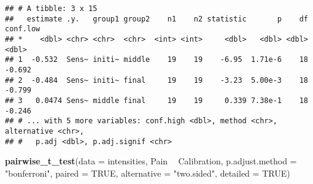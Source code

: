 \documentclass[
]{article}
\newenvironment{Shaded}{\begin{snugshade}}{\end{snugshade}}
\newcommand{\CommentTok}[1]{\textcolor[rgb]{0.56,0.35,0.01}{\textit{#1}}}
\newcommand{\DataTypeTok}[1]{\textcolor[rgb]{0.13,0.29,0.53}{#1}}
\newcommand{\DecValTok}[1]{\textcolor[rgb]{0.00,0.00,0.81}{#1}}
\newcommand{\KeywordTok}[1]{\textcolor[rgb]{0.13,0.29,0.53}{\textbf{#1}}}
\newcommand{\NormalTok}[1]{#1}
\newcommand{\OperatorTok}[1]{\textcolor[rgb]{0.81,0.36,0.00}{\textbf{#1}}}
\newcommand{\OtherTok}[1]{\textcolor[rgb]{0.56,0.35,0.01}{#1}}
\newcommand{\StringTok}[1]{\textcolor[rgb]{0.31,0.60,0.02}{#1}}
\begin{document}
\begin{Shaded}
\end{Shaded}

\begin{verbatim}
## # A tibble: 3 x 15
##   estimate .y.   group1 group2    n1    n2 statistic       p    df conf.low
## *    <dbl> <chr> <chr>  <chr>  <int> <int>     <dbl>   <dbl> <dbl>    <dbl>
## 1  -0.532  Sens~ initi~ middle    19    19    -6.95  1.71e-6    18   -0.692
## 2  -0.484  Sens~ initi~ final     19    19    -3.23  5.00e-3    18   -0.799
## 3   0.0474 Sens~ middle final     19    19     0.339 7.38e-1    18   -0.246
## # ... with 5 more variables: conf.high <dbl>, method <chr>, alternative <chr>,
## #   p.adj <dbl>, p.adj.signif <chr>
\end{verbatim}

\begin{Shaded}
\begin{Highlighting}[]
\KeywordTok{pairwise_t_test}\NormalTok{(}\DataTypeTok{data =}\NormalTok{ intensities, Pain }\OperatorTok{~}\StringTok{ }\NormalTok{Calibration, }\DataTypeTok{p.adjust.method =} \StringTok{"bonferroni"}\NormalTok{, }\DataTypeTok{paired =} \OtherTok{TRUE}\NormalTok{, }\DataTypeTok{alternative =} \StringTok{"two.sided"}\NormalTok{, }\DataTypeTok{detailed =} \OtherTok{TRUE}\NormalTok{)}
\end{Highlighting}
\end{Shaded}
\end{document}
